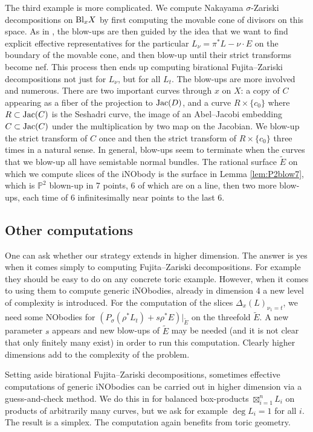 \documentclass[12pt]{amsart}
\theoremstyle{definition}
\newcommand{\bb}{\ensuremath{\mathfrak{b}}}
\newcommand{\inob}[2]{\ensuremath{{\Delta}_{#1}(#2)}}
\newcommand{\?}{ \circled{{\large\bf ?}}}
\let\bb\mathbb
\begin{document}
The third example is more complicated. We compute Nakayama $\sigma$-Zariski decompositions on ${\rm Bl}_xX$ by first computing the movable cone of divisors on this space. As in \cite{FLjac}, the blow-ups are then guided by the idea that we want to find explicit effective representatives for the particular $L_{\nu}=\pi^*L-\nu\cdot E$ on the boundary of the movable cone, and then blow-up until their strict transforms become nef. This process then ends up computing birational Fujita--Zariski decompositions not just for $L_{\nu}$, but for all $L_t$.
The blow-ups are more involved and numerous. There are two important curves through $x$ on $X$: a copy of $C$ appearing as a fiber of the projection to ${\rm Jac}(D)$, and a curve $R\times \{c_0\}$ where $R\subset{\rm Jac}(C)$ is the Seshadri curve, the image of an Abel--Jacobi embedding $C\subset{\rm Jac}(C)$ under the multiplication by two map on the Jacobian. We blow-up the strict transform of $C$ once and then the strict transform of $R\times\{c_0\}$ three times in a natural sense. In general, blow-ups seem to terminate when the curves that we blow-up all have semistable normal bundles. The rational surface $\widetilde E$ on which we compute slices of the iNObody is the surface in Lemma \ref{lem:P2blow7}, which is $\bb P^2$ blown-up in 7 points, 6 of which are on a line, then two more blow-ups, each time of 6 infinitesimally near points to the last 6.


\subsection{Other computations}
One can ask whether our strategy extends in higher dimension. 
The answer is yes when it comes simply to computing Fujita--Zariski decompositions. For example they should be easy to do on any concrete toric example. However, when it comes to using them to compute generic iNObodies, already in dimension 4 a new level of complexity is introduced. For the computation of the slices $\inob{x}{L}_{\nu_1=t}$, we need some NObodies for $(P_{\sigma}(\rho^*L_t)+s\rho^*E)|_{\widetilde E}$
on the threefold $\widetilde E$. A new parameter $s$ appears and new blow-ups of $\widetilde E$ may be needed (and it is not clear that only finitely many exist) in order to run this computation. Clearly higher dimensions add to the complexity of the problem.

Setting aside birational Fujita--Zariski decompositions, sometimes effective computations of generic iNObodies can be carried out in higher dimension via a guess-and-check method. We do this in \cite{FLproductcurves} for balanced box-products $\boxtimes_{i=1}^nL_i$ on products of arbitrarily many curves, but we ask for example $\deg L_i=1$ for all $i$. The result is a simplex. The computation again benefits from toric geometry.
\end{document}

